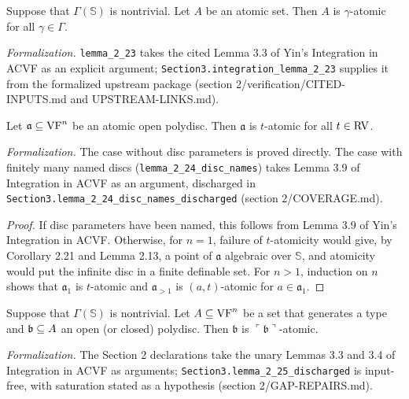 \setcounter{theorem}{22}
\begin{lemma}
\label{atomic-base-change}
\leanok
{}
Suppose that $\Gamma(\mathbb{S})$ is nontrivial. Let $A$ be an atomic set. Then $A$ is $\gamma$-atomic for all $\gamma \in \Gamma$.

\emph{Formalization.} \texttt{lemma\_2\_23} takes the cited Lemma 3.3 of Yin's Integration in ACVF as an explicit argument; \texttt{Section3.integration\_lemma\_2\_23} supplies it from the formalized upstream package (section 2/verification/CITED-INPUTS.md and UPSTREAM-LINKS.md).
\end{lemma}

\setcounter{theorem}{23}
\begin{lemma}
\label{at-ball-t}
\leanok
{}
Let $\mathfrak{a} \subseteq \mathrm{VF}^n$ be an atomic open polydisc. Then $\mathfrak{a}$ is $t$-atomic for all $t \in \mathrm{RV}$.

\emph{Formalization.} The case without disc parameters is proved directly. The case with finitely many named discs (\texttt{lemma\_2\_24\_disc\_names}) takes Lemma 3.9 of Integration in ACVF as an argument, discharged in \texttt{Section3.lemma\_2\_24\_disc\_names\_discharged} (section 2/COVERAGE.md).
\end{lemma}

\begin{proof}
\leanok
If disc parameters have been named, this follows from Lemma 3.9 of Yin's Integration in ACVF. Otherwise, for $n = 1$, failure of $t$-atomicity would give, by Corollary 2.21 and Lemma 2.13, a point of $\mathfrak{a}$ algebraic over $\mathbb{S}$, and atomicity would put the infinite disc in a finite definable set. For $n > 1$, induction on $n$ shows that $\mathfrak{a}_1$ is $t$-atomic and $\mathfrak{a}_{>1}$ is $(a,t)$-atomic for $a \in \mathfrak{a}_1$.
\end{proof}

\setcounter{theorem}{24}
\begin{lemma}
\label{atom-self}
\leanok
{}
Suppose that $\Gamma(\mathbb{S})$ is nontrivial. Let $A \subseteq \mathrm{VF}^n$ be a set that generates a type and $\mathfrak{b} \subseteq A$ an open (or closed) polydisc. Then $\mathfrak{b}$ is $\ulcorner \mathfrak{b} \urcorner$-atomic.

\emph{Formalization.} The Section 2 declarations take the unary Lemmas 3.3 and 3.4 of Integration in ACVF as arguments; \texttt{Section3.lemma\_2\_25\_discharged} is input-free, with saturation stated as a hypothesis (section 2/GAP-REPAIRS.md).
\end{lemma}


